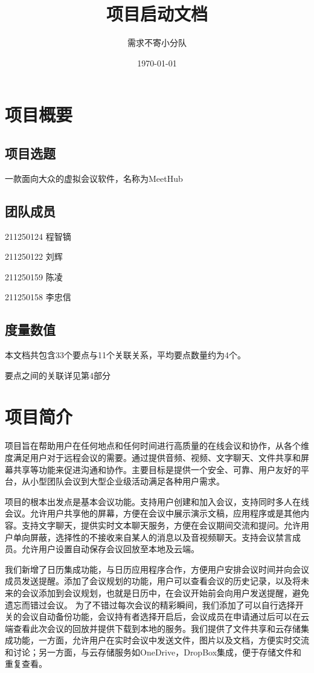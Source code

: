 \documentclass[a4paper,12pt]{article}
\title{项目启动文档}
\author{需求不寄小分队}
\date{\today}
\begin{document}
    \maketitle

    \tableofcontents

    \section{项目概要}

    \subsection{项目选题}
    一款面向大众的虚拟会议软件，名称为MeetHub
    \subsection{团队成员}
    211250124 程智镝

    211250122 刘辉

    211250159 陈凌

    211250158 李忠信
    \subsection{度量数值}
    本文档共包含33个要点与11个关联关系，平均要点数量约为4个。

    要点之间的关联详见第4部分

    \section{项目简介}
    项目旨在帮助用户在任何地点和任何时间进行高质量的在线会议和协作，从各个维度满足用户对于远程会议的需要。通过提供音频、视频、文字聊天、文件共享和屏幕共享等功能来促进沟通和协作。主要目标是提供一个安全、可靠、用户友好的平台，从小型团队会议到大型企业级活动满足各种用户需求。

    项目的根本出发点是基本会议功能。支持用户创建和加入会议，支持同时多人在线会议。允许用户共享他的屏幕，方便在会议中展示演示文稿，应用程序或是其他内容。支持文字聊天，提供实时文本聊天服务，方便在会议期间交流和提问。允许用户单向屏蔽，选择性的不接收来自某人的消息以及音视频聊天。支持会议禁言成员。允许用户设置自动保存会议回放至本地及云端。

    我们新增了日历集成功能，与日历应用程序合作，方便用户安排会议时间并向会议成员发送提醒。添加了会议规划的功能，用户可以查看会议的历史记录，以及将未来的会议添加到会议规划，也就是日历中，在会议开始前会向用户发送提醒，避免遗忘而错过会议。
    为了不错过每次会议的精彩瞬间，我们添加了可以自行选择开关的会议自动备份功能，会议持有者选择开启后，会议成员在申请通过后可以在云端查看此次会议的回放并提供下载到本地的服务。我们提供了文件共享和云存储集成功能，一方面，允许用户在实时会议中发送文件，图片以及文档，方便实时交流和讨论；另一方面，与云存储服务如OneDrive，DropBox集成，便于存储文件和重复查看。
\end{document}
